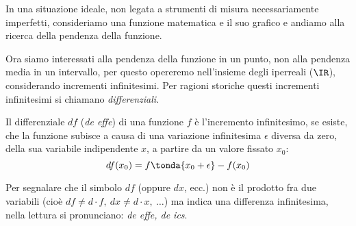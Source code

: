 In una situazione ideale, non legata a strumenti di misura necessariamente 
imperfetti, consideriamo una funzione matematica e il suo grafico e andiamo 
alla ricerca della pendenza della funzione. 

Ora siamo interessati alla pendenza della funzione in un punto, non alla 
pendenza media in un intervallo, per questo opereremo nell'insieme degli 
iperreali (\(\IR\)), 
considerando incrementi infinitesimi. 
Per ragioni storiche questi incrementi infinitesimi si chiamano 
\emph{differenziali}.
\begin{definizione}
Il differenziale \(df\) (\emph{de effe}) di una funzione \(f\) è 
l'incremento infinitesimo, se esiste, 
che la funzione subisce a causa di una variazione infinitesima 
\(\epsilon\) diversa da zero, della sua variabile indipendente \(x\), 
a partire da un valore fissato \(x_0\):
\[df(x_0) = f \tonda{x_0 + \epsilon} - f(x_0)\]
\end{definizione}



\begin{osservazione}
Per segnalare che il simbolo \(df\) (oppure \(dx\), ecc.) non è il prodotto 
fra due variabili 
(cioè \(df \ne d \cdot f,\ dx \ne d\cdot x,\ \dots\)) ma indica 
una differenza infinitesima, nella lettura si pronunciano:
\textit{de effe, de ics}.
\end{osservazione}

